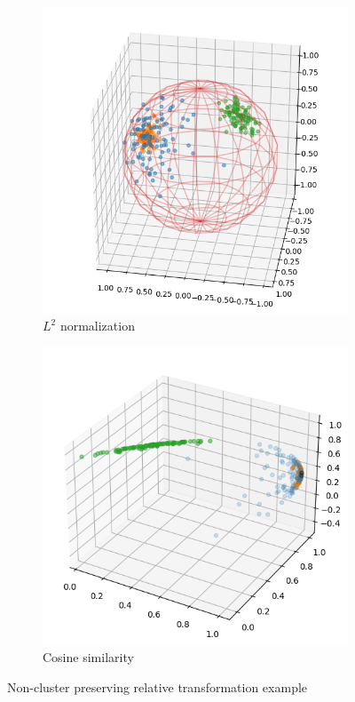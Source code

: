 \documentclass[../main.tex]{subfiles}
\begin{document}
\begin{figure}[ht!]
\begin{subfigure}[b]{0.45\textwidth}
         \includegraphics[width=\textwidth]{figures/rs/stitching/clusters_2.png}
        \caption{$L^2$ normalization}
         \label{fig:rel_ex_2}
     \end{subfigure}
     \begin{subfigure}[b]{0.45\textwidth}
         \centering
         \includegraphics[width=\textwidth]{figures/rs/stitching/clusters_3.png}
        \caption{Cosine similarity}
         \label{fig:rel_ex_3}
     \end{subfigure}
    \caption{Non-cluster preserving relative transformation example}
    \label{fig:rel_ex_bad}
\end{figure}
\end{document}
